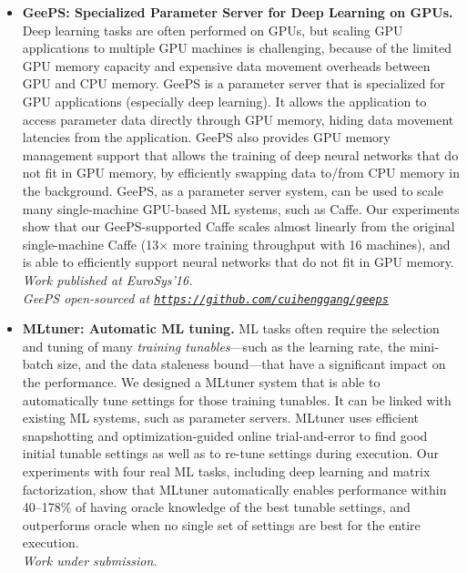 \documentclass[10pt]{article}
\newenvironment{innerlist}[1][\enskip\textbullet]%
        {\begin{itemize}[#1,leftmargin=*,parsep=0pt,itemsep=0pt,topsep=0pt,partopsep=0pt]}
        {\end{itemize}}
\providecommand*\url[1]{\href{#1}{#1}}
\renewcommand*\url[1]{\href{#1}{\texttt{#1}}}
\begin{document}
\begin{innerlist}
    \emph{Work published at SoCC'14.}
\vspace{.1in}
\item[] {\bf GeePS: Specialized Parameter Server for Deep Learning on GPUs.}
    Deep learning tasks are often performed on GPUs, but scaling GPU applications to multiple GPU machines is challenging, because of the limited GPU memory capacity and expensive data movement overheads between GPU and CPU memory. GeePS is a parameter server that is specialized for GPU applications (especially deep learning). It allows the application to access parameter data directly through GPU memory, hiding data movement latencies from the application. GeePS also provides GPU memory management support that allows the training of deep neural networks that do not fit in GPU memory, by efficiently swapping data to/from CPU memory in the background. GeePS, as a parameter server system, can be used to scale many single-machine GPU-based ML systems, such as Caffe. Our experiments show that our GeePS-supported Caffe scales almost linearly from the original single-machine Caffe (13$\times$ more training throughput with 16 machines), and is able to efficiently support neural networks that do not fit in GPU memory. \\
    \emph{Work published at EuroSys'16.} \\
    \emph{GeePS open-sourced at \url{https://github.com/cuihenggang/geeps}}
\vspace{.1in}
\item[] {\bf MLtuner: Automatic ML tuning.}
    ML tasks often require the selection and tuning of many
    \emph{training tunables}---such as
    the learning rate, the mini-batch size, and the data
    staleness bound---that have a significant impact on the performance.
    We designed a MLtuner system that
    is able to automatically tune settings for those training tunables.
    It can be linked with existing ML systems, such as parameter servers.
    MLtuner uses efficient snapshotting and optimization-guided
    online trial-and-error to find good initial tunable settings as well
    as to re-tune settings during execution.
    Our experiments with
    four real ML tasks, including deep learning and matrix factorization,
    show that MLtuner automatically enables
    performance within 40--178\% of having oracle knowledge of
    the best tunable settings, and outperforms oracle when no single set of
    settings are best for the entire execution. \\
    \emph{Work under submission.} \\
\end{innerlist}
\end{document}
